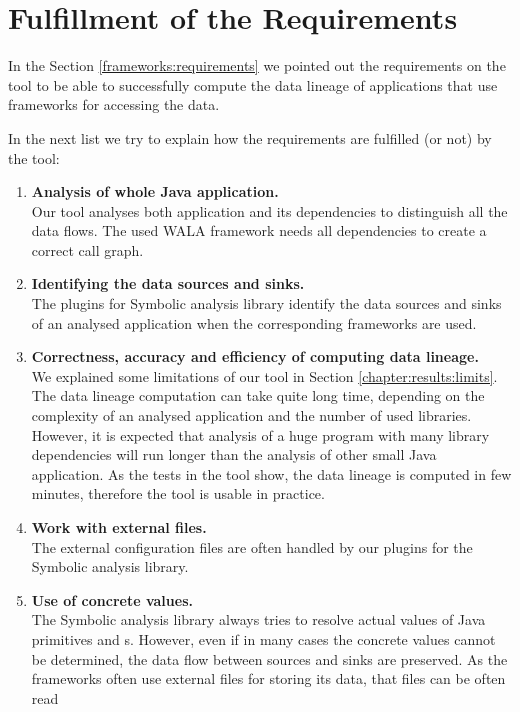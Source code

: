 \section{Fulfillment of the Requirements}

In the Section \ref{frameworks:requirements} we pointed out the requirements
on the \ToolName tool to be able to successfully compute the data lineage of
applications that use frameworks for accessing the data.

In the next list we try to explain how the requirements are fulfilled (or not)
by the \ToolName tool:
\begin{enumerate}
  \item \textbf{Analysis of whole Java application.} \\
    Our tool analyses both application and its dependencies
    to distinguish all the data flows. The used WALA framework
    needs all dependencies to create a correct call graph.
  \item \textbf{Identifying the data sources and sinks.} \\
    The plugins for Symbolic analysis library identify the data sources and sinks
    of an analysed application when the corresponding frameworks are used.
  \item \textbf{Correctness, accuracy and efficiency of computing data lineage.} \\
    We explained some limitations of our \ToolName tool in Section \ref{chapter:results:limits}.
    The data lineage computation can take quite long time, depending on the complexity of an analysed
    application and the number of used libraries.
    However, it is expected that analysis of a huge program with many library dependencies
    will run longer than the analysis of other small Java application.
    As the tests in the \ToolName tool show, the data lineage is computed
    in few minutes, therefore the tool is usable in practice.
  \item \textbf{Work with external files.} \\
    The external configuration files are often handled by our plugins for the Symbolic analysis library.
  \item \textbf{Use of concrete values.} \\
    The Symbolic analysis library always tries to resolve actual values of Java primitives and
    s. However, even if in many cases the concrete values cannot be determined,
    the data flow between sources and sinks are preserved.
    As the frameworks often use external files for storing its data, that files can be often read

\end{enumerate}
